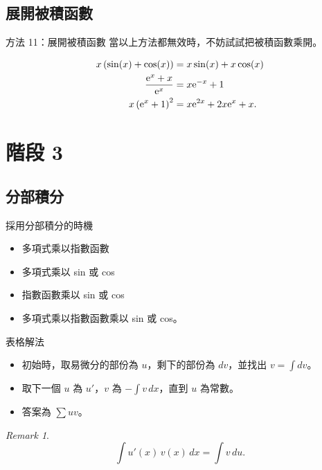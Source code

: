 \documentclass{beamer}
\newcommand{\e}{\textup e}
\theoremstyle{remark}
\newtheorem{remark}{Remark}
\begin{document}
\begin{CJK}{UTF8}{bsmi}
\subsection{展開被積函數}
\begin{frame}{方法 11：展開被積函數}
  當以上方法都無效時，不妨試試把被積函數乘開。
  \begin{example}
    \begin{align*}
      x \left( \sin(x) + \cos(x) \right) &= x \sin(x) + x \cos(x)\\
      \frac{\e^x + x}{\e^x} &= x \e^{-x} + 1\\
      x \left( \e^x + 1 \right)^2 &= x \e^{2x} + 2x \e^x + x.
    \end{align*}
  \end{example}
\end{frame}

\section{階段 3}
\subsection{分部積分}
\begin{frame}{採用分部積分的時機}
  \begin{itemize}
    \item 多項式乘以指數函數
    \item 多項式乘以 sin 或 cos
    \item 指數函數乘以 sin 或 cos
    \item 多項式乘以指數函數乘以 sin 或 cos。
  \end{itemize}
\end{frame}

\begin{frame}{表格解法}
  \begin{theorem}
    \begin{itemize}
      \item 初始時，取易微分的部份為 $u$，剩下的部份為 $dv$，並找出 $v = \int dv$。
      \item 取下一個 $u$ 為 $u'$，$v$ 為 $-\int v\,dx$，直到 $u$ 為常數。
      \item 答案為 $\sum uv$。
    \end{itemize}
  \end{theorem}
  \begin{remark}
    \[\int u'(x)\,v(x)\,dx = \int v\,du.\]
  \end{remark}
\end{frame}


\end{CJK}
\end{document}
